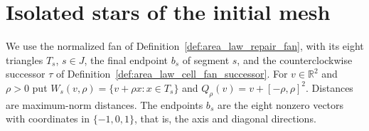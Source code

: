 \section{Isolated stars of the initial mesh}
\label{sec:area_law_initial_stars}

We use the normalized fan of Definition~\ref{def:area_law_repair_fan},
with its eight triangles $T_s$, $s\in J$, the final endpoint $b_s$ of
segment $s$, and the counterclockwise successor $\tau$ of
Definition~\ref{def:area_law_cell_fan_successor}. For $v\in\mathbb R^2$
and $\rho>0$ put $W_s(v,\rho)=\{v+\rho x:x\in T_s\}$ and
$Q_\rho(v)=v+[-\rho,\rho]^2$. Distances are maximum-norm distances.
The endpoints $b_s$ are the eight nonzero vectors with coordinates in
$\{-1,0,1\}$, that is, the axis and diagonal directions.

